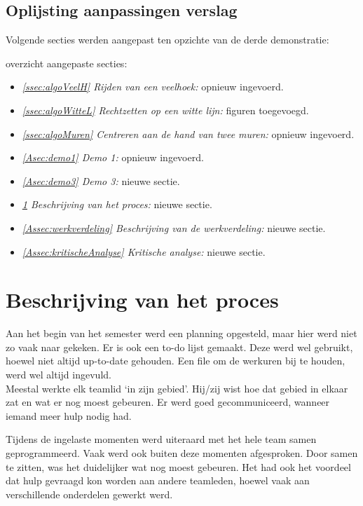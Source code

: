 \documentclass[eind]{penoverslag}
\begin{document}
\subsection{Oplijsting aanpassingen verslag} %
\label{Assec:aanp3}
Volgende secties werden aangepast ten opzichte van de derde demonstratie:

overzicht aangepaste secties:
\begin{itemize}
	\item \textit{\ref{ssec:algoVeelH} Rijden van een veelhoek:} opnieuw ingevoerd.
	\item \textit{\ref{ssec:algoWitteL} Rechtzetten op een witte lijn:} figuren toegevoegd.
	\item \textit{\ref{ssec:algoMuren} Centreren aan de hand van twee muren:} opnieuw ingevoerd.
	\item \textit{\ref{Asec:demo1} Demo 1:} opnieuw ingevoerd.
	\item \textit{\ref{Asec:demo3} Demo 3:} nieuwe sectie.
	\item \textit{\ref{Assec:beschrijvingProces} Beschrijving van het proces:} nieuwe sectie.
	\item \textit{\ref{Assec:werkverdeling} Beschrijving van de werkverdeling:} nieuwe sectie.
	\item \textit{\ref{Assec:kritischeAnalyse} Kritische analyse:} nieuwe sectie.
\end{itemize}

\section{Beschrijving van het proces}
\label{Assec:beschrijvingProces}
Aan het begin van het semester werd een planning opgesteld, maar hier werd niet zo vaak naar gekeken. Er is ook een to-do lijst gemaakt. Deze werd wel gebruikt, hoewel niet altijd up-to-date gehouden. Een file om de werkuren bij te houden, werd wel altijd ingevuld.\\

Meestal werkte elk teamlid `in zijn gebied'. Hij/zij wist hoe dat gebied in elkaar zat en wat er nog moest gebeuren. Er werd goed gecommuniceerd, wanneer iemand meer hulp nodig had.

Tijdens de ingelaste momenten werd uiteraard met het hele team samen geprogrammeerd. Vaak werd ook buiten deze momenten afgesproken. Door samen te zitten, was het duidelijker wat nog moest gebeuren. Het had ook het voordeel dat hulp gevraagd kon worden aan andere teamleden, hoewel vaak aan verschillende onderdelen gewerkt werd.
\end{document}
